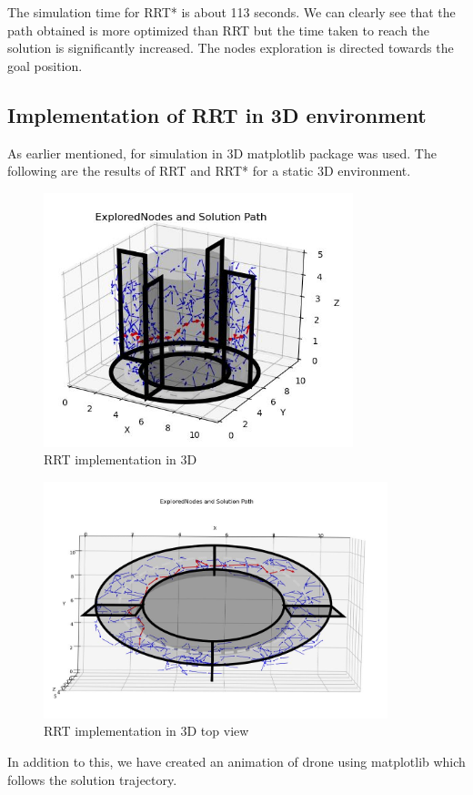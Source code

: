 \documentclass{IEEEtran}
\begin{document}
The simulation time for RRT* is about 113 seconds. We can clearly see that the path obtained is more optimized than RRT but the time taken to reach the solution is significantly increased. The nodes exploration is directed towards the goal position.

\subsection{\textbf{Implementation of RRT in 3D environment}}
As earlier mentioned, for simulation in 3D matplotlib package was used. The following are the results of RRT and RRT* for a static 3D environment.
\begin{figure}[h]
    \includegraphics[width=9cm]{rrt3d}
    \caption{RRT implementation in 3D}
    \label{fig:RRT implementation in 3D}
\end{figure} 
\newpage
\begin{figure}[h]
    \centering
    \includegraphics[width=10cm]{rrt3dtop}
    \caption{RRT implementation in 3D top view}
    \label{fig:RRT implementation in 3D top view}
\end{figure}
In addition to this, we have created an animation of drone using matplotlib which follows the solution trajectory.
\end{document}
